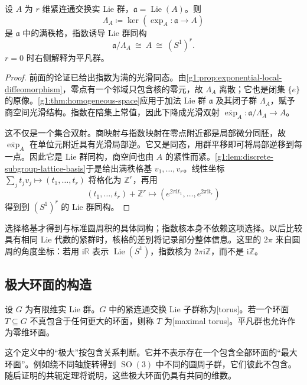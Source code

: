 \begin{theorem}\label{g1:thm:compact-connected-abelian-group}
	设 \(A\) 为 \(r\) 维紧连通交换实 Lie 群，\(\mathfrak a=\operatorname{Lie}(A)\)。则
	\[
		\Lambda_A\coloneqq\ker(\exp_A:\mathfrak a\to A)
	\]
	是 \(\mathfrak a\) 中的满秩格，指数诱导 Lie 群同构
	\[
		\mathfrak a/\Lambda_A\ \cong\ A\ \cong\ (S^1)^r.
	\]
	\(r=0\) 时右侧解释为平凡群。
\end{theorem}
\begin{proof}
	前面的论证已给出指数为满的光滑同态。由\cref{g1:prop:exponential-local-diffeomorphism}，零点有一个邻域只包含核的零元，故 \(\Lambda_A\) 离散；它也是闭集 \(\{e\}\) 的原像。\cref{g1:thm:homogeneous-space}应用于加法 Lie 群 \(\mathfrak a\) 及其闭子群 \(\Lambda_A\)，赋予商空间光滑结构。指数在陪集上常值，因此下降成光滑双射 \(\overline{\exp}_A:\mathfrak a/\Lambda_A\to A\)。

	这不仅是一个集合双射。商映射与指数映射在零点附近都是局部微分同胚，故 \(\overline{\exp}_A\) 在单位元附近具有光滑局部逆。它又是同态，用群平移即可将局部逆移到每一点。因此它是 Lie 群同构，商空间也由 \(A\) 的紧性而紧。\cref{g1:lem:discrete-subgroup-lattice-basis}于是给出满秩格基 \(v_1,\ldots,v_r\)。线性坐标 \(\sum_jt_jv_j\mapsto(t_1,\ldots,t_r)\) 将格化为 \(\mathbb Z^r\)，再用
	\[
		(t_1,\ldots,t_r)+\mathbb Z^r\longmapsto
		(e^{2\pi\mathrm{i}t_1},\ldots,e^{2\pi\mathrm{i}t_r})
	\]
	得到到 \((S^1)^r\) 的 Lie 群同构。
\end{proof}

选择格基才得到与标准圆周积的具体同构；指数核本身不依赖这项选择。以后比较具有相同 Lie 代数的紧群时，核格的差别将记录部分整体信息。这里的 \(2\pi\) 来自圆周的角度坐标：若用 \(\mathrm{i}\mathbb R\) 表示 \(\operatorname{Lie}(S^1)\)，指数核为 \(2\pi\mathrm{i}\mathbb Z\)，而不是 \(\mathrm{i}\mathbb Z\)。

\subsection{极大环面的构造}
\label{g1:subsec:1902:03}
\begin{definition}\label{g1:def:maximal-torus}
	设 \(G\) 为有限维实 Lie 群。\(G\) 中的紧连通交换 Lie 子群称为[torus]。若一个环面 \(T\subseteq G\) 不真包含于任何更大的环面，则称 \(T\) 为[maximal torus]。平凡群也允许作为零维环面。
\end{definition}

这个定义中的“极大”按包含关系判断。它并不表示存在一个包含全部环面的“最大环面”。例如绕不同轴旋转得到 \(\operatorname{SO}(3)\) 中不同的圆周子群，它们彼此不包含。随后证明的共轭定理将说明，这些极大环面仍具有共同的维数。

